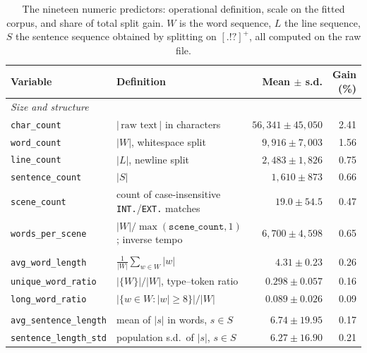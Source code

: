 \documentclass[conference,a4paper]{IEEEtran}
\begin{document}
\begin{table}[t]
\caption{The nineteen numeric predictors: operational definition, scale
on the fitted corpus, and share of total split gain. $W$ is the word
sequence, $L$ the line sequence, $S$ the sentence sequence obtained by
splitting on $[.!?]^{+}$, all computed on the raw file.}
\label{tab:vardef}
\centering
\small
\begin{tabular}{llrr}
\toprule
\textbf{Variable} & \textbf{Definition} & \textbf{Mean $\pm$ s.d.} & \textbf{Gain (\%)} \\
\midrule
\multicolumn{4}{l}{\emph{Size and structure}}\\
\texttt{char\_count}           & $|\,\text{raw text}\,|$ in characters                        & $56{,}341 \pm 45{,}050$ & 2.41 \\
\texttt{word\_count}           & $|W|$, whitespace split                                      & $9{,}916 \pm 7{,}003$   & 1.56 \\
\texttt{line\_count}           & $|L|$, newline split                                         & $2{,}483 \pm 1{,}826$   & 0.75 \\
\texttt{sentence\_count}       & $|S|$                                                        & $1{,}610 \pm 873$       & 0.66 \\
\texttt{scene\_count}          & count of case-insensitive \texttt{INT.}/\texttt{EXT.} matches & $19.0 \pm 54.5$        & 0.47 \\
\texttt{words\_per\_scene}     & $|W| / \max(\texttt{scene\_count}, 1)$; inverse tempo         & $6{,}700 \pm 4{,}598$   & 0.65 \\
\addlinespace[3pt]
\multicolumn{4}{l}{\emph{Lexical sophistication}}\\
\texttt{avg\_word\_length}     & $\frac{1}{|W|}\sum_{w \in W} |w|$                            & $4.31 \pm 0.23$         & 0.26 \\
\texttt{unique\_word\_ratio}   & $|\{W\}| / |W|$, type--token ratio                           & $0.298 \pm 0.057$       & 0.16 \\
\texttt{long\_word\_ratio}     & $|\{w \in W : |w| \ge 8\}| / |W|$                            & $0.089 \pm 0.026$       & 0.09 \\
\addlinespace[3pt]
\multicolumn{4}{l}{\emph{Sentence geometry}}\\
\texttt{avg\_sentence\_length} & mean of $|s|$ in words, $s \in S$                            & $6.74 \pm 19.95$        & 0.17 \\
\texttt{sentence\_length\_std} & population s.d.\ of $|s|$, $s \in S$                         & $6.27 \pm 16.90$        & 0.21 \\

\end{tabular}
\end{table}
\end{document}

